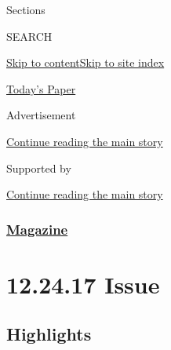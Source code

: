 Sections

SEARCH

\protect\hyperlink{site-content}{Skip to
content}\protect\hyperlink{site-index}{Skip to site index}

\href{https://myaccount.nytimes3xbfgragh.onion/auth/login?response_type=cookie\&client_id=vi}{}

\href{https://www.nytimes3xbfgragh.onion/section/todayspaper}{Today's
Paper}

Advertisement

\protect\hyperlink{after-top}{Continue reading the main story}

Supported by

\protect\hyperlink{after-sponsor}{Continue reading the main story}

\hypertarget{magazine}{%
\subsubsection{\texorpdfstring{\href{/section/magazine}{Magazine}}{Magazine}}\label{magazine}}

\hypertarget{122417-issue}{%
\section{12.24.17 Issue}\label{122417-issue}}

\hypertarget{highlights}{%
\subsection{Highlights}\label{highlights}}

